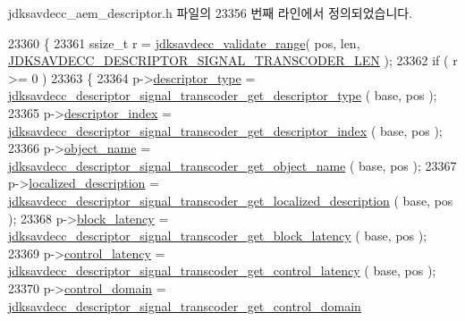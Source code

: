 jdksavdecc\+\_\+aem\+\_\+descriptor.\+h 파일의 23356 번째 라인에서 정의되었습니다.


\begin{DoxyCode}
23360 \{
23361     ssize\_t r = \hyperlink{group__util_ga9c02bdfe76c69163647c3196db7a73a1}{jdksavdecc\_validate\_range}( pos, len, 
      \hyperlink{group__descriptor__transcoder_gad7874b3634edd5a908909a5659dd899c}{JDKSAVDECC\_DESCRIPTOR\_SIGNAL\_TRANSCODER\_LEN} );
23362     \textcolor{keywordflow}{if} ( r >= 0 )
23363     \{
23364         p->\hyperlink{structjdksavdecc__descriptor__signal__transcoder_ab7c32b6c7131c13d4ea3b7ee2f09b78d}{descriptor\_type} = 
      \hyperlink{group__descriptor__transcoder_ga8097241417c86bf8cfbeb06f7b1b0b7b}{jdksavdecc\_descriptor\_signal\_transcoder\_get\_descriptor\_type}
      ( base, pos );
23365         p->\hyperlink{structjdksavdecc__descriptor__signal__transcoder_a042bbc76d835b82d27c1932431ee38d4}{descriptor\_index} = 
      \hyperlink{group__descriptor__transcoder_gaa9f83dde99db2fc87750e5279f44749b}{jdksavdecc\_descriptor\_signal\_transcoder\_get\_descriptor\_index}
      ( base, pos );
23366         p->\hyperlink{structjdksavdecc__descriptor__signal__transcoder_a7d1f5945a13863b1762fc6db74fa8f80}{object\_name} = 
      \hyperlink{group__descriptor__transcoder_gaa5935b90e69fb14206e774132e705472}{jdksavdecc\_descriptor\_signal\_transcoder\_get\_object\_name}
      ( base, pos );
23367         p->\hyperlink{structjdksavdecc__descriptor__signal__transcoder_a0926f846ca65a83ad5bb06b4aff8f408}{localized\_description} = 
      \hyperlink{group__descriptor__transcoder_gad1755f3c362f3775331e6edd818212d9}{jdksavdecc\_descriptor\_signal\_transcoder\_get\_localized\_description}
      ( base, pos );
23368         p->\hyperlink{structjdksavdecc__descriptor__signal__transcoder_ae2e9f0088d5e900b610d1b2818dfc559}{block\_latency} = 
      \hyperlink{group__descriptor__transcoder_ga747b2b28da46e2c0f3bf92f45ff433cf}{jdksavdecc\_descriptor\_signal\_transcoder\_get\_block\_latency}
      ( base, pos );
23369         p->\hyperlink{structjdksavdecc__descriptor__signal__transcoder_ab2bd4639caaf9a8078b68368afbd63b6}{control\_latency} = 
      \hyperlink{group__descriptor__transcoder_gafbe51054f4b853727f902d0eb37499cf}{jdksavdecc\_descriptor\_signal\_transcoder\_get\_control\_latency}
      ( base, pos );
23370         p->\hyperlink{structjdksavdecc__descriptor__signal__transcoder_a8937b22996b7c28ae209f29fe777f03a}{control\_domain} = 
      \hyperlink{group__descriptor__transcoder_ga888814a14a73fbfafd1f19c3458607ea}{jdksavdecc\_descriptor\_signal\_transcoder\_get\_control\_domain}

\end{DoxyCode}
